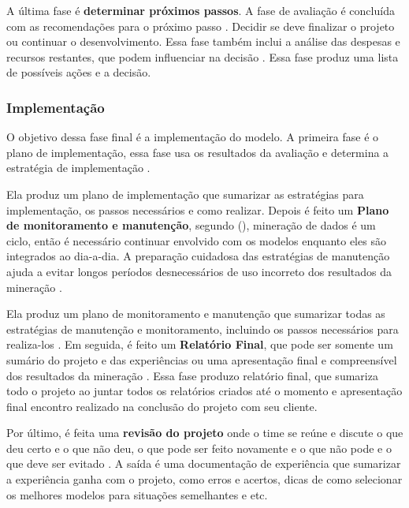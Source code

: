 A última fase é \textbf{determinar próximos passos}. A fase de avaliação é concluída com as recomendações para o próximo passo \citep{dmfd}. Decidir se deve finalizar o projeto ou continuar o desenvolvimento. Essa fase também inclui a análise das despesas  e recursos restantes, que podem influenciar na decisão \citep{crispmanual}.
Essa fase produz uma lista de possíveis ações e a decisão.


\subsubsection{Implementação}
O objetivo dessa fase final é a implementação do modelo.
A primeira fase é o plano de implementação, essa fase usa os resultados da avaliação e determina a estratégia de implementação \citep{crispmanual}. 

Ela produz um plano de implementação que sumarizar as estratégias para implementação, os passos necessários e como realizar.
Depois é feito um \textbf{Plano de monitoramento e manutenção}, segundo \citeauthor{dmfd} (\citeyear{dmfd}), mineração de dados é um ciclo, então é necessário continuar envolvido com os modelos enquanto eles são integrados ao dia-a-dia. A preparação cuidadosa das estratégias de manutenção ajuda a evitar longos períodos desnecessários de uso incorreto dos resultados da mineração \citep{crispmanual}.

Ela produz um plano de monitoramento e manutenção que sumarizar todas as estratégias de manutenção e monitoramento, incluindo os passos necessários para realiza-los \citep{crispmanual}.
Em seguida, é feito um \textbf{Relatório Final}, que pode ser somente um sumário do projeto e das experiências ou uma apresentação final e compreensível dos resultados da mineração \citep{crispmanual}.
Essa fase produzo relatório final, que sumariza todo o projeto ao juntar todos os relatórios criados até o momento \citep{dmfd} e apresentação final encontro realizado na conclusão do projeto com seu cliente.

Por último, é feita uma \textbf{revisão do projeto} onde o time se reúne e discute o que deu certo e o que não deu, o que pode ser feito novamente e o que não pode e o que deve ser evitado \citep{dmfd}.
A saída é uma documentação de experiência que sumarizar a experiência ganha com o projeto, como erros e acertos, dicas de como selecionar os melhores modelos para situações semelhantes e etc.

